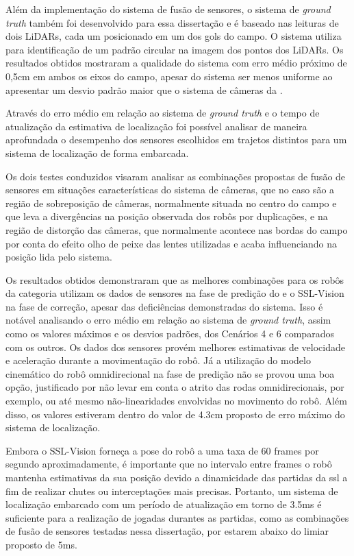 \documentclass[acronym, symbols, table, deposito]{fei}
\begin{document}
	Além da implementação do sistema de fusão de sensores, o sistema de \textit{ground truth} também foi desenvolvido para essa dissertação e é baseado nas leituras de dois LiDARs, cada um posicionado em um dos gols do campo. O sistema utiliza  para identificação de um padrão circular na imagem dos pontos dos LiDARs. Os resultados obtidos mostraram a qualidade do sistema com erro médio próximo de 0,5cm em ambos os eixos do campo, apesar do sistema ser menos uniforme ao apresentar um desvio padrão maior que o sistema de câmeras da .
	
	Através do erro médio em relação ao sistema de \textit{ground truth} e o tempo de atualização da estimativa de localização foi possível analisar de maneira aprofundada o desempenho dos sensores escolhidos em trajetos distintos para um sistema de localização de forma embarcada.
	
	Os dois testes conduzidos visaram analisar as combinações propostas de fusão de sensores em situações características do sistema de câmeras, que no caso são a região de sobreposição de câmeras, normalmente situada no centro do campo e que leva a divergências na posição observada dos robôs por duplicações, e na região de distorção das câmeras, que normalmente acontece nas bordas do campo por conta do efeito olho de peixe das lentes utilizadas e acaba influenciando na posição lida pelo sistema.
	
	Os resultados obtidos demonstraram que as melhores combinações para os robôs da categoria  utilizam os dados de sensores na fase de predição do  e o SSL-Vision na fase de correção, apesar das deficiências demonstradas do sistema. Isso é notável analisando o erro médio em relação ao sistema de \textit{ground truth}, assim como os valores máximos e os desvios padrões, dos Cenários 4 e 6 comparados com os outros. Os dados dos sensores provém melhores estimativas de velocidade e aceleração durante a movimentação do robô. Já a utilização do modelo cinemático do robô omnidirecional na fase de predição não se provou uma boa opção, justificado por não levar em conta o atrito das rodas omnidirecionais, por exemplo, ou até mesmo não-linearidades envolvidas no movimento do robô. Além disso, os valores estiveram dentro do valor de 4.3cm proposto de erro máximo do sistema de localização. 
	
	Embora o SSL-Vision forneça a pose do robô a uma taxa de 60 frames por segundo aproximadamente, é importante que no intervalo entre frames o robô mantenha estimativas da sua posição devido a dinamicidade das partidas da \acrshort{ssl} a fim de realizar chutes ou interceptações mais precisas. Portanto, um sistema de localização embarcado com um período de atualização em torno de 3.5ms é suficiente para a realização de jogadas durantes as partidas, como as combinações de fusão de sensores testadas nessa dissertação, por estarem abaixo do limiar proposto de 5ms.
	
\end{document}
